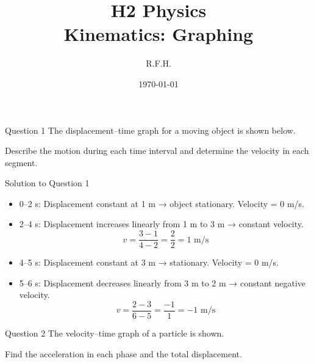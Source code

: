 \documentclass{beamer}
\title{H2 Physics \\ Kinematics: Graphing}
\author{R.F.H.}
\date{\today}
\begin{document}
\begin{frame}
\titlepage
\end{frame}

\begin{frame}[shrink=15]{Question 1}
The displacement–time graph for a moving object is shown below.
\begin{center}
\end{center}
Describe the motion during each time interval and determine the velocity in each segment.
\end{frame}

\begin{frame}[shrink=15]{Solution to Question 1}
\begin{itemize}
    \item 0–2 s: Displacement constant at 1 m → object stationary. Velocity = 0 m/s.
    \item 2–4 s: Displacement increases linearly from 1 m to 3 m → constant velocity.
          \[ v = \frac{3-1}{4-2} = \frac{2}{2} = 1 \text{ m/s} \]
    \item 4–5 s: Displacement constant at 3 m → stationary. Velocity = 0 m/s.
    \item 5–6 s: Displacement decreases linearly from 3 m to 2 m → constant negative velocity.
          \[ v = \frac{2-3}{6-5} = \frac{-1}{1} = -1 \text{ m/s} \]
\end{itemize}
\end{frame}

\begin{frame}[shrink=15]{Question 2}
The velocity–time graph of a particle is shown.
\begin{center}
\end{center}
Find the acceleration in each phase and the total displacement.
\end{frame}
\end{document}
